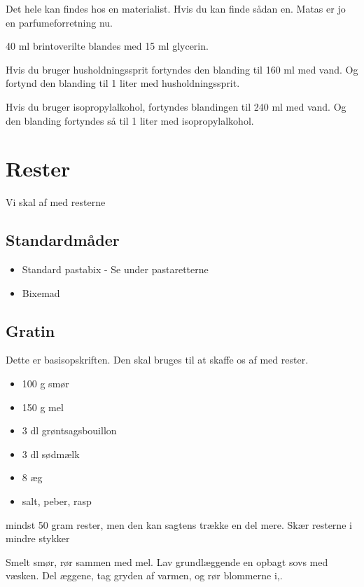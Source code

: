 \documentclass[
]{book}
\providecommand{\tightlist}{%
  \setlength{\itemsep}{0pt}\setlength{\parskip}{0pt}}
\begin{document}
Det hele kan findes hos en materialist. Hvis du kan finde sådan en. Matas er jo en parfumeforretning nu.

40 ml brintoverilte blandes med 15 ml glycerin.

Hvis du bruger husholdningssprit fortyndes den blanding til 160 ml med vand. Og fortynd den blanding til 1 liter med husholdningssprit.

Hvis du bruger isopropylalkohol, fortyndes blandingen til 240 ml med vand. Og den blanding fortyndes så til 1 liter med isopropylalkohol.

\hypertarget{rester}{%
\chapter{Rester}\label{rester}}

Vi skal af med resterne

\hypertarget{standardmuxe5der}{%
\section{Standardmåder}\label{standardmuxe5der}}

\begin{itemize}
\tightlist
\item
  Standard pastabix - Se under pastaretterne
\item
  Bixemad
\end{itemize}

\hypertarget{gratin}{%
\section{Gratin}\label{gratin}}

Dette er basisopskriften. Den skal bruges til at skaffe os af med rester.

\begin{itemize}
\tightlist
\item
  100 g smør
\item
  150 g mel
\item
  3 dl grøntsagsbouillon
\item
  3 dl sødmælk
\item
  8 æg
\item
  salt, peber, rasp
\end{itemize}

mindst 50 gram rester, men den kan sagtens trække en del mere.
Skær resterne i mindre stykker

Smelt smør, rør sammen med mel. Lav grundlæggende en opbagt
sovs med væsken.
Del æggene, tag gryden af varmen, og rør blommerne i,.
\end{document}
